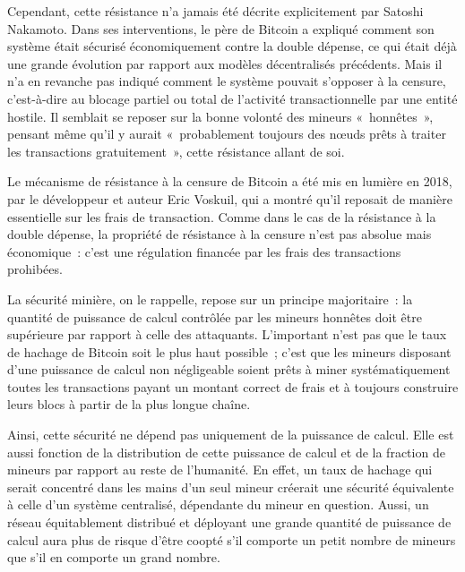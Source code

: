 Cependant, cette résistance n'a jamais été décrite explicitement par Satoshi Nakamoto. Dans ses interventions, le père de Bitcoin a expliqué comment son système était sécurisé économiquement contre la double dépense, ce qui était déjà une grande évolution par rapport aux modèles décentralisés précédents. Mais il n'a en revanche pas indiqué comment le système pouvait s'opposer à la censure, c'est-à-dire au blocage partiel ou total de l'activité transactionnelle par une entité hostile. Il semblait se reposer sur la bonne volonté des mineurs «~honnêtes~», pensant même qu'il y aurait «~probablement toujours des nœuds prêts à traiter les transactions gratuitement~», cette résistance allant de soi.

Le mécanisme de résistance à la censure de Bitcoin a été mis en lumière en 2018, par le développeur et auteur Eric Voskuil, qui a montré qu'il reposait de manière essentielle sur les frais de transaction. Comme dans le cas de la résistance à la double dépense, la propriété de résistance à la censure n'est pas absolue mais économique~: c'est une régulation financée par les frais des transactions prohibées.

\clearpage
La sécurité minière, on le rappelle, repose sur un principe majoritaire~: la quantité de puissance de calcul contrôlée par les mineurs honnêtes doit être supérieure par rapport à celle des attaquants. L'important n'est pas que le taux de hachage de Bitcoin soit le plus haut possible~; c'est que les mineurs disposant d'une puissance de calcul non négligeable soient prêts à miner systématiquement toutes les transactions payant un montant correct de frais et à toujours construire leurs blocs à partir de la plus longue chaîne. %

Ainsi, cette sécurité ne dépend pas uniquement de la puissance de calcul. Elle est aussi fonction de la distribution de cette puissance de calcul et de la fraction de mineurs par rapport au reste de l'humanité. En effet, un taux de hachage qui serait concentré dans les mains d'un seul mineur créerait une sécurité équivalente à celle d'un système centralisé, dépendante du mineur en question. Aussi, un réseau équitablement distribué et déployant une grande quantité de puissance de calcul aura plus de risque d'être coopté s'il comporte un petit nombre de mineurs que s'il en comporte un grand nombre.

